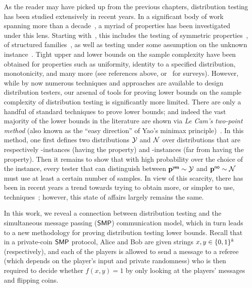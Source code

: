 As the reader may have picked up from the previous chapters, distribution testing has been studied extensively in recent years. In a significant body of work spanning more than a decade~\cite{BFFKRW:01,Paninski:04,BDKR:05,Paninski:08,ADJOP:11,BFRV:11,LRR:13,VV:14,CDVV:14,WY:14,JVW:14,BV:15,DK:16}, a myriad of properties has been investigated under this lens. Starting with~\cite{GRexp:00,BFRSW:10,BFFKRW:01}, this includes the testing of symmetric properties~\cite{RRSS:09,Valiant:11,VV:11:stoc,ValiantValiant:11}, of structured families~\cite{BKR:04,ILR:12,AD:15,Canonne:15,ADK:15,CDGR:16,Canonne:16}, as well as testing under some assumption on the unknown instance~\cite{RS:09,DDSVV:13,DKN:15,DKN:15:FOCS}. Tight upper and lower bounds on the sample complexity have been obtained for properties such as uniformity, identity to a specified distribution, monotonicity, and many more (see references above, or~\cite{Rubinfeld:12:Survey,Canonne:15:Survey} for surveys).
 However, while by now numerous techniques and approaches are available to design distribution testers, our arsenal of tools for proving lower bounds on the sample complexity of distribution testing is significantly more limited. There are only a handful of standard techniques to prove lower bounds; and indeed the vast majority of the lower bounds in the literature are shown via \emph{Le Cam's two-point method} (also known as the ``easy direction'' of Yao's minimax principle)~\cite{Yu:97,Pollard:2003}. In this method, one first defines two distributions $\cal Y$ and $\cal N$ over distributions that are respectively \yes-instances (having the property) and \no-instances (far from having the property). Then it remains to show that with high probability over the choice of the instance, every tester that can distinguish between $\mathbf{p}^{\textsf{yes}} \sim \cal Y$ and $\mathbf{p}^{\textsf{no}} \sim \cal N$ must use at least a certain number of samples. In view of this scarcity, there has been in recent years a trend towards trying to obtain more, or simpler to use, techniques~\cite{Valiant:11,DK:16}; however, this state of affairs largely remains the same.

In this work, we reveal a connection between distribution testing and the simultaneous message passing ($\mathsf{SMP}$) communication model, which in turn leads to a new methodology for proving distribution testing lower bounds. Recall that in a private-coin $\mathsf{SMP}$ protocol, Alice and Bob are given strings $x,y \in \{0,1\}^k$ (respectively), and each of the players is allowed to send a message to a referee (which depends on the player's input and private randomness) who is then required to decide whether $f(x,y)=1$ by only looking at the players' messages and flipping coins.

